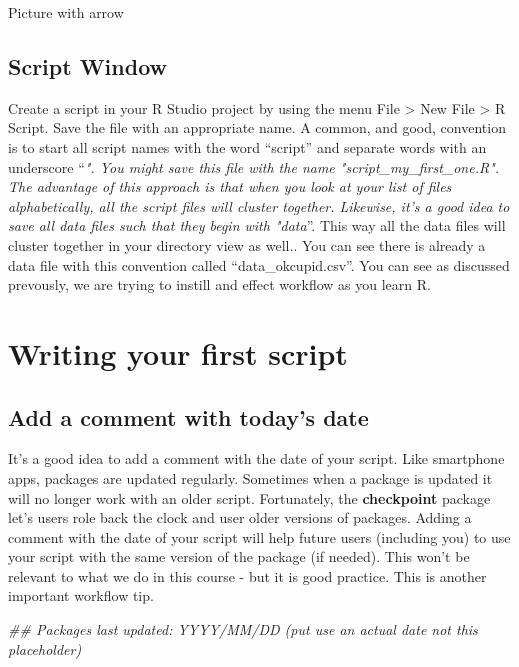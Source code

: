 \documentclass[
]{krantz}
\makeatletter
\newenvironment{Shaded}{\begin{snugshade}}{\end{snugshade}}
\newcommand{\CommentTok}[1]{\textcolor[rgb]{0.37,0.37,0.37}{\textit{#1}}}
\newenvironment{kframe}{%
\medskip{}
\setlength{\fboxsep}{.8em}
 \def\at@end@of@kframe{}%
 \ifinner\ifhmode%
  \def\at@end@of@kframe{\end{minipage}}%
  \begin{minipage}{\columnwidth}%
 \fi\fi%
 \def\FrameCommand##1{\hskip\@totalleftmargin \hskip-\fboxsep
 \colorbox{shadecolor}{##1}\hskip-\fboxsep
     \hskip-\linewidth \hskip-\@totalleftmargin \hskip\columnwidth}%
 \MakeFramed {\advance\hsize-\width
   \@totalleftmargin\z@ \linewidth\hsize
   \@setminipage}}%
 {\par\unskip\endMakeFramed%
 \at@end@of@kframe}
\renewenvironment{Shaded}{\begin{kframe}}{\end{kframe}}
\makeatother
\begin{document}
Picture with arrow

\hypertarget{script-window}{%
\subsection{Script Window}\label{script-window}}

Create a script in your R Studio project by using the menu File \textgreater{} New File \textgreater{} R Script.
Save the file with an appropriate name. A common, and good, convention is to start all script names with the word ``script'' and separate words with an underscore ``\emph{". You might save this file with the name "script\_my\_first\_one.R". The advantage of this approach is that when you look at your list of files alphabetically, all the script files will cluster together. Likewise, it's a good idea to save all data files such that they begin with "data}''. This way all the data files will cluster together in your directory view as well.. You can see there is already a data file with this convention called ``data\_okcupid.csv''. You can see as discussed prevously, we are trying to instill and effect workflow as you learn R.

\hypertarget{writing-your-first-script}{%
\section{Writing your first script}\label{writing-your-first-script}}

\hypertarget{add-a-comment-with-todays-date}{%
\subsection{Add a comment with today's date}\label{add-a-comment-with-todays-date}}

It's a good idea to add a comment with the date of your script. Like smartphone apps, packages are updated regularly. Sometimes when a package is updated it will no longer work with an older script. Fortunately, the \textbf{checkpoint} package let's users role back the clock and user older versions of packages. Adding a comment with the date of your script will help future users (including you) to use your script with the same version of the package (if needed). This won't be relevant to what we do in this course - but it is good practice. This is another important workflow tip.

\begin{Shaded}
\begin{Highlighting}[]
\CommentTok{## Packages last updated: YYYY/MM/DD (put use an actual date not this placeholder)}
\end{Highlighting}
\end{Shaded}
\end{document}
